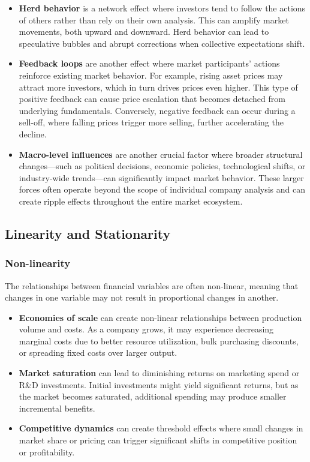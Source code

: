 \documentclass[11pt,english,a4paper,hidelinks]{book}
\begin{document}
\begin{itemize}
    \item \textbf{Herd behavior} is a network effect where investors tend to follow the actions of others rather than rely on their own analysis. This can amplify market movements, both upward and downward. Herd behavior can lead to speculative bubbles and abrupt corrections when collective expectations shift.

    \item \textbf{Feedback loops} are another effect where market participants' actions reinforce existing market behavior. For example, rising asset prices may attract more investors, which in turn drives prices even higher. This type of positive feedback can cause price escalation that becomes detached from underlying fundamentals. Conversely, negative feedback can occur during a sell-off, where falling prices trigger more selling, further accelerating the decline.
    \item \textbf{Macro-level influences} are another crucial factor where broader structural changes—such as political decisions, economic policies, technological shifts, or industry-wide trends—can significantly impact market behavior. These larger forces often operate beyond the scope of individual company analysis and can create ripple effects throughout the entire market ecosystem.
\end{itemize}

\subsection{Linearity and Stationarity}

\subsubsection{Non-linearity}
\noindent The relationships between financial variables are often non-linear, meaning that changes in one variable may not result in proportional changes in another.

\begin{itemize}
    \item \textbf{Economies of scale} can create non-linear relationships between production volume and costs. As a company grows, it may experience decreasing marginal costs due to better resource utilization, bulk purchasing discounts, or spreading fixed costs over larger output.
    
    \item \textbf{Market saturation} can lead to diminishing returns on marketing spend or R\&D investments. Initial investments might yield significant returns, but as the market becomes saturated, additional spending may produce smaller incremental benefits.
    
    \item \textbf{Competitive dynamics} can create threshold effects where small changes in market share or pricing can trigger significant shifts in competitive position or profitability.
\end{itemize}
\end{document}
